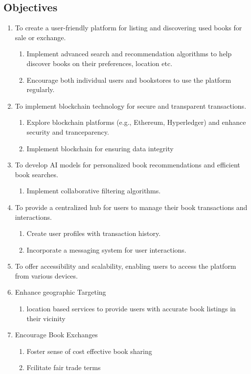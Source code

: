 \documentclass{article}
\begin{document}
\subsection{Objectives}
\begin{enumerate}
    \item To create a user-friendly platform for listing and discovering used books for sale or exchange.
      \begin{enumerate}
          \item Implement advanced search and recommendation algorithms to help discover books on their preferences, location etc.
          \item Encourage both individual users and bookstores to use the platform regularly.
      \end{enumerate}
    \item To implement blockchain technology for secure and transparent transactions.
      \begin{enumerate}
          \item Explore blockchain platforms (e.g., Ethereum, Hyperledger) and enhance security and tranceparency.
          \item Implement blockchain for ensuring data integrity
      \end{enumerate}
    \item To develop AI models for personalized book recommendations and efficient book searches.
      \begin{enumerate}
          \item Implement collaborative filtering algorithms.
      \end{enumerate}
    \item To provide a centralized hub for users to manage their book transactions and interactions.
      \begin{enumerate}
          \item Create user profiles with transaction history.
          \item Incorporate a messaging system for user interactions.
      \end{enumerate}
    \item To offer accessibility and scalability, enabling users to access the platform from various devices.
    \item Enhance geographic Targeting
      \begin{enumerate}
       \item location based services to provide users with accurate book listings in their vicinity
      \end{enumerate}
       \item Encourage Book Exchanges
      \begin{enumerate}
          \item Foster sense of cost effective book sharing
         \item Fcilitate fair trade terms
      \end{enumerate}
  \end{enumerate}
\end{document}
